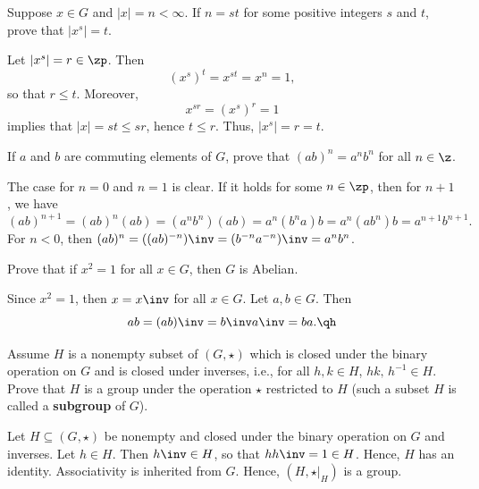 \begin{exercise}\label{ex1.1.23}
    Suppose $x \in G$ and $|x| = n < \infty$. If $n = st$ for some positive integers $s$ and $t$, prove that $|x^s| = t$.
\end{exercise}

\begin{sol}
    Let $|x^s| = r \in \zp$. Then
    \[(x^s)^t = x^{st} = x^n = 1,\]
    so that $r \leq t$. Moreover,
    \[x^{sr} = (x^s)^r = 1\]
    implies that $|x| = st \leq sr$, hence $t \leq r$. Thus, $|x^s| = r = t$.
\end{sol}

\begin{exercise}\label{ex1.1.24}
    If $a$ and $b$ are commuting elements of $G$, prove that $(ab)^n = a^n b^n$ for all $n \in \z$. 
    
\end{exercise}

\begin{sol}
    The case for $n = 0$ and $n = 1$ is clear. If it holds for some $n \in \zp$, then for $n + 1$, we have
    \[(ab)^{n + 1} = (ab)^n (ab) = (a^n b^n)(ab) = a^n (b^n a) b = a^n (ab^n) b = a^{n + 1} b^{n + 1}.\]
    For $n < 0$, then $(ab)^n = ((ab)^{-n})\inv = (b^{-n} a^{-n})\inv = a^n b^n$.
\end{sol}

\begin{exercise}\label{ex1.1.25}
    Prove that if $x^2 = 1$ for all $x \in G$, then $G$ is Abelian.
\end{exercise}

\begin{sol}
    Since $x^2 = 1$, then $x = x\inv$ for all $x \in G$. Let $a, b \in G$. Then
    \[ab = (ab)\inv = b\inv a\inv = ba. \qh\]
\end{sol}

\begin{specialexercise}[Subgroups] \label{ex1.1.26}
    Assume $H$ is a nonempty subset of $(G, \star)$ which is closed under the binary operation on $G$ and is closed under inverses, i.e., for all $h, k \in H$, $hk, \, h^{-1} \in H$. Prove that $H$ is a group under the operation $\star$ restricted to $H$ (such a subset $H$ is called a \textbf{subgroup} of $G$).
\end{specialexercise}

\begin{sol}
    Let $H \subseteq (G, \star)$ be nonempty and closed under the binary operation on $G$ and inverses. Let $h \in H$. Then $h\inv \in H$, so that $hh\inv = 1 \in H$. Hence, $H$ has an identity. Associativity is inherited from $G$. Hence, $(H, \star|_H)$ is a group.
\end{sol}

